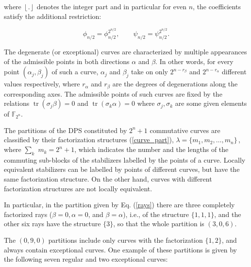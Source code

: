 \documentclass[quantumrep,article,submit,pdftex,moreauthors]{Definitions/mdpi}
\DeclareMathOperator{\tr}{tr}
\providecommand{\DIFadd}[1]{{\protect\color{blue}\uwave{#1}}} %
\providecommand{\DIFdel}[1]{{\protect\color{red}\sout{#1}}}                      %
\providecommand{\DIFaddbegin}{} %
\providecommand{\DIFaddend}{} %
\providecommand{\DIFdelbegin}{} %
\providecommand{\DIFdelend}{} %
\begin{document}
where $\left\lfloor . \right\rfloor$ denotes the integer part and in particular
for even $n$, the coefficients satisfy the additional restriction: 

\DIFaddbegin 

\DIFaddend \begin{equation}
  \phi_{n/2} = \phi_{n/2}^{2^{n/2}},
  \qquad \psi_{n/2} = \psi_{n/2}^{2^{n/2}}.
\end{equation}

The degenerate (or exceptional) curves are characterized by multiple appearances
of the admissible points in both directions $\alpha $ and $\beta$. In other
words, for every point $(\alpha_{j},\beta_{j})$ of such a curve, $\alpha_{j}$
and $\beta_{j}$ take on only $2^{n-r_{\beta }}$ and $2^{n-r_{\alpha}}$ different
values respectively, where $r_{\alpha }$ and $r_{\beta }$ are the degrees of
degenerations along the corresponding axes.  The admissible points of such
curves are fixed by the relations $\tr(\sigma_{j}\beta)=0$ and
$\tr(\sigma_{k}\alpha)=0$ where $\sigma_{j}, \sigma_{k}$ are some given elements
of $\mathbb{F}_{2^{n}}$.

The partitions of the DPS constituted by $2^{n}+1$ commutative curves are
classified by their factorization structures (\ref{curve_part}), \DIFdelbegin \DIFdel{$\lambda
=\{m_{1},m_{2},\ldots ,m_{n}\}\,$}\DIFdelend \DIFaddbegin \DIFadd{$\lambda =
\{m_{1},m_{2},\ldots ,m_{n}\}\,$}\DIFaddend , where $\sum_{k}$ $m_{k}=2^{n}+1$, which
indicates the number and the lengths of the commuting sub-blocks of the
stabilizers labelled by the points of a curve. Locally equivalent stabilizers
can be labelled by points of different curves, but have the same factorization
structure. On the other hand, curves with different factorization structures are
not locally equivalent.

In particular, in the partition given by Eq. (\ref{rays}) there are three
completely factorized rays ($\beta = 0, \alpha = 0$, and $\beta = \alpha$),
i.e., of the structure $\{1,1,1\}$, and the other six rays have the structure
$\{3\}$, so that the whole partition is $(3,0,6)$.

The $(0,9,0)$ partitions include only curves with the factorization $\{1,2\}$,
and always contain exceptional curves. One example of these partitions is given
by the following seven regular and two exceptional curves:
\end{document}
